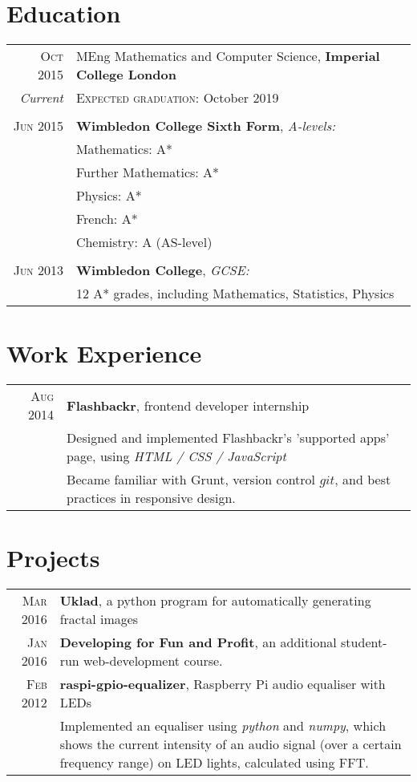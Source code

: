 \documentclass[a4paper,10pt]{article}
\begin{document}
\section{Education}
\begin{tabular}{rl}	
    \textsc{Oct} 2015 & MEng Mathematics and Computer Science, \textbf{Imperial College London}\\
    \emph{Current}    & \textsc{Expected graduation}: October 2019\\&\\
    \textsc{Jun} 2015 & \textbf{Wimbledon College Sixth Form}, \emph{A-levels:}\\
                      & Mathematics: A*\\
                      & Further Mathematics: A*\\
                      & Physics: A*\\
                      & French: A*\\
                      & Chemistry: A (AS-level)\\&\\
    \textsc{Jun} 2013 & \textbf{Wimbledon College}, \emph{GCSE:}\\
                      & 12 A* grades, including Mathematics, Statistics, Physics
\end{tabular}

\section{Work Experience}
\begin{tabular}{r|p{11cm}}
    \textsc{Aug} 2014 & \textbf{Flashbackr}, frontend developer internship\\
                      & \footnotesize{Designed and implemented Flashbackr's 'supported apps' page, using \emph{HTML / CSS / JavaScript}}\\
                      & \footnotesize{Became familiar with Grunt, version control \(git\), and best practices in responsive design.}
\end{tabular}

\section{Projects}
\begin{tabular}{r|p{11cm}}
    \textsc{Mar} 2016 & \textbf{Uklad}, a python program for automatically generating fractal images\\
    \textsc{Jan} 2016 & \textbf{Developing for Fun and Profit}, an additional student-run web-development course.\\
    \textsc{Feb} 2012 & \textbf{raspi-gpio-equalizer}, Raspberry Pi audio equaliser with LEDs\\
                      & \footnotesize{Implemented an equaliser using \emph{python} and \emph{numpy}, which shows the
                        current intensity of an audio signal (over a certain frequency range) on LED lights, calculated using FFT.}
\end{tabular}
\end{document}
